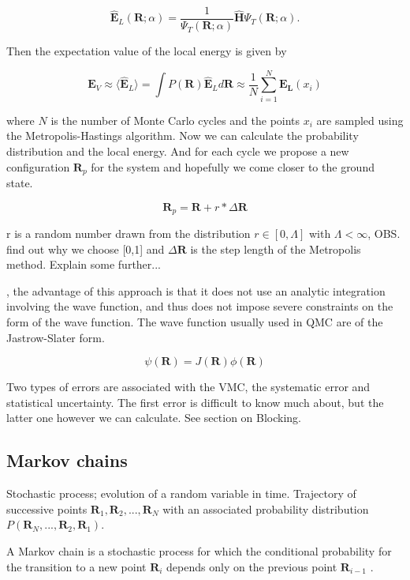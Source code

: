 $$\widehat{\mathbf{E}}_L(\mathbf{R};\alpha) = \frac{1}{\Psi_T(\mathbf{R};\alpha)}\widehat{\mathbf{H}}\Psi_T(\mathbf{R};\alpha).$$

Then the expectation value of the local energy is given by

$$\mathbf{E}_V \approx \langle \widehat{\mathbf{E}}_L\rangle = \int P(\mathbf{R}) \widehat{\mathbf{E}}_L d\mathbf{R} \approx \frac{1}{N} \sum_{i = 1}^N \mathbf{E_L}(x_i)$$

where $N$ is the number of Monte Carlo cycles and the points $x_i$ are sampled using the Metropolis-Hastings algorithm. Now we can calculate the probability distribution and the local energy. And for each cycle we propose a new configuration $\mathbf{R}_p$ for the system and hopefully we come closer to the ground state.

$$\mathbf{R}_p = \mathbf{R} + r \ast \Delta \mathbf{R}$$

r is a random number drawn from the distribution $r \in [0, \Lambda]$ with $\Lambda < \infty$, OBS. find out why we choose [0,1] and $\Delta \mathbf{R}$ is the step length of the Metropolis method. Explain some further... 

\cite{toulouse2016introduction}, the advantage of this approach is that it does not use an analytic integration involving the wave function, and thus does not impose severe constraints on the form of the wave function. 
The wave function usually used in QMC are of the Jastrow-Slater form. 

\begin{equation}
\psi(\mathbf{R}) = J(\mathbf{R}) \phi (\mathbf{R})
\end{equation}

Two types of errors are associated with the VMC, the systematic error and  statistical uncertainty. The first error is difficult to know much about, but the latter one however we can calculate. See section on Blocking.

\subsection{Markov chains}
Stochastic process; evolution of a random variable in time. Trajectory of successive points $\mathbf{R}_1, \mathbf{R}_2, ...,\mathbf{R}_N$ with an associated probability distribution $P(\mathbf{R}_N, ...,\mathbf{R}_2,\mathbf{R}_1)$.  

A Markov chain is a stochastic process for which the conditional probability for the transition to a new point $\mathbf{R}_i$ depends only on the previous point $\mathbf{R}_{i-1}$ \cite{toulouse2016introduction}. 

